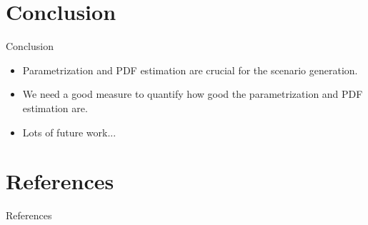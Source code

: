 \documentclass[aspectratio=\AspectR,10pt,compress,t]{beamer} %
\begin{document}
\section{Conclusion}
\begin{frame}{Conclusion}
	\begin{itemize}
		\item Parametrization and PDF estimation are crucial for the scenario generation.
		\item We need a good measure to quantify how good the parametrization and PDF estimation are.
		\item Lots of future work...
	\end{itemize}
\end{frame}

\section{References}
\begin{frame}{References}
\end{frame}

\begin{frame}[allowframebreaks]
	\scriptsize{}
	
\end{frame}
\end{document}
